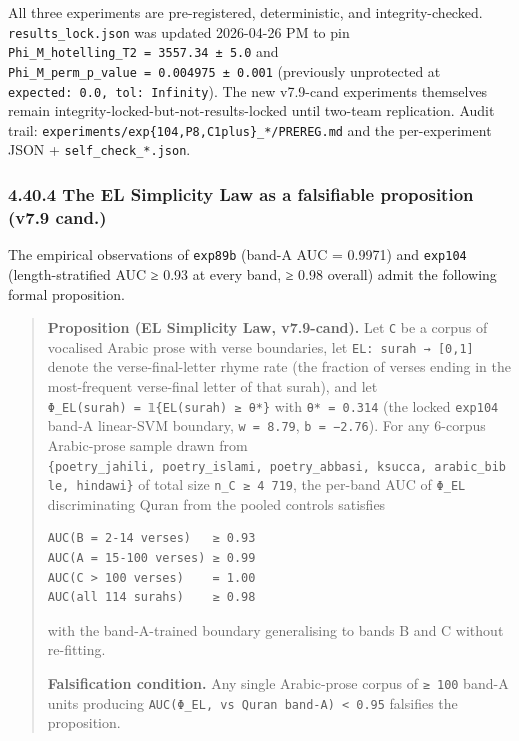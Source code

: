 \documentclass[
]{article}
\begin{document}
All three experiments are pre-registered, deterministic, and
integrity-checked. \texttt{results\_lock.json} was updated 2026-04-26 PM
to pin \texttt{Phi\_M\_hotelling\_T2\ =\ 3557.34\ ±\ 5.0} and
\texttt{Phi\_M\_perm\_p\_value\ =\ 0.004975\ ±\ 0.001} (previously
unprotected at \texttt{expected:\ 0.0,\ tol:\ Infinity}). The new
v7.9-cand experiments themselves remain
integrity-locked-but-not-results-locked until two-team replication.
Audit trail: \texttt{experiments/exp\{104,P8,C1plus\}\_*/PREREG.md} and
the per-experiment JSON + \texttt{self\_check\_*.json}.

\subsubsection{4.40.4 The EL Simplicity Law as a falsifiable proposition
(v7.9
cand.)}\label{the-el-simplicity-law-as-a-falsifiable-proposition-v7.9-cand.}

The empirical observations of \texttt{exp89b} (band-A AUC = 0.9971) and
\texttt{exp104} (length-stratified AUC ≥ 0.93 at every band, ≥ 0.98
overall) admit the following formal proposition.

\begin{quote}
\textbf{Proposition (EL Simplicity Law, v7.9-cand).} Let \texttt{C} be a
corpus of vocalised Arabic prose with verse boundaries, let
\texttt{EL:\ surah\ →\ {[}0,1{]}} denote the verse-final-letter rhyme
rate (the fraction of verses ending in the most-frequent verse-final
letter of that surah), and let
\texttt{Φ\_EL(surah)\ =\ 𝟙\{EL(surah)\ ≥\ θ*\}} with
\texttt{θ*\ =\ 0.314} (the locked \texttt{exp104} band-A linear-SVM
boundary, \texttt{w\ =\ 8.79}, \texttt{b\ =\ −2.76}). For any 6-corpus
Arabic-prose sample drawn from
\texttt{\{poetry\_jahili,\ poetry\_islami,\ poetry\_abbasi,\ ksucca,\ arabic\_bible,\ hindawi\}}
of total size \texttt{n\_C\ ≥\ 4\ 719}, the per-band AUC of
\texttt{Φ\_EL} discriminating Quran from the pooled controls satisfies

\begin{verbatim}
AUC(B = 2-14 verses)   ≥ 0.93
AUC(A = 15-100 verses) ≥ 0.99
AUC(C > 100 verses)    = 1.00
AUC(all 114 surahs)    ≥ 0.98
\end{verbatim}

with the band-A-trained boundary generalising to bands B and C without
re-fitting.

\textbf{Falsification condition.} Any single Arabic-prose corpus of
\texttt{≥\ 100} band-A units producing
\texttt{AUC(Φ\_EL,\ vs\ Quran\ band-A)\ \textless{}\ 0.95} falsifies the
proposition.
\end{quote}
\end{document}
